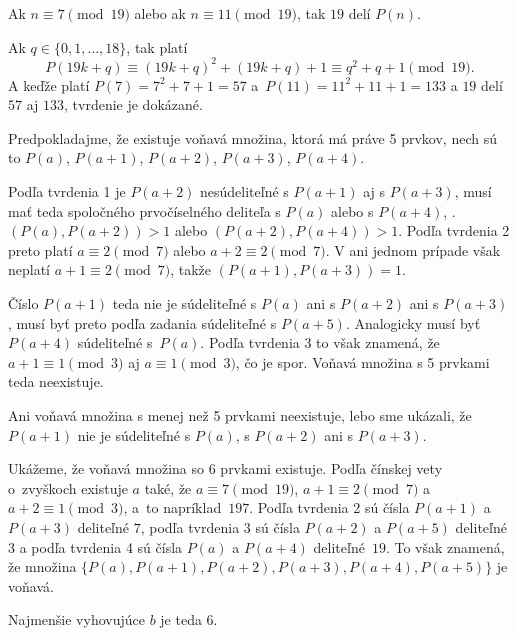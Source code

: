 {
Ak $n\equiv7\pmod{19}$ alebo ak $n\equiv11\pmod{19}$, tak $19$ delí $P(n)$.

\dokaz
Ak $q\in\{0,1,\dots,18\}$, tak platí $$P(19k+q)\equiv(19k+q)^2+(19k+q)+1\equiv q^2+q+1\pmod{19}.$$ A keďže platí
$P(7)=7^2+7+1=57$ a~$P(11)=11^2+11+1=133$ a $19$ delí $57$ aj $133$, tvrdenie je dokázané.

\smallskip
Predpokladajme, že existuje voňavá množina, ktorá má práve 5 prvkov,
nech sú to
$P(a)$,
$P(a+1)$,
$P(a+2)$,
$P(a+3)$,
$P(a+4)$.

Podľa tvrdenia 1 je $P(a+2)$ nesúdeliteľné s $P(a+1)$ aj s $P(a+3)$,
musí mať teda spoločného prvočíselného deliteľa s $P(a)$ alebo s $P(a+4)$,
\tj.
$(P(a),P(a+2))>1$
alebo
$(P(a+2),P(a+4))>1$.
Podľa tvrdenia 2 preto platí
$a\equiv2\pmod7$
alebo
$a+2\equiv2\pmod7$.
V ani jednom prípade však neplatí
$a+1\equiv2\pmod7$,
takže
$(P({a+1}),P({a+3}))=1$.

Číslo $P(a+1)$ teda nie je súdeliteľné s $P(a)$ ani s $P(a+2)$ ani s $P(a+3)$,
musí byť preto podľa zadania súdeliteľné s $P(a+5)$.
Analogicky musí byť $P(a+4)$ súdeliteľné s~$P(a)$.
Podľa tvrdenia 3 to však znamená, že
$a+1\equiv1\pmod3$
aj
$a\equiv1\pmod3$,
čo je spor.
Voňavá množina s 5 prvkami teda neexistuje.

Ani voňavá množina s menej než 5 prvkami neexistuje,
lebo sme ukázali, že $P({a+1})$ nie je súdeliteľné s $P(a)$, s $P(a+2)$ ani s $P(a+3)$.

Ukážeme, že voňavá množina so 6 prvkami existuje.
Podľa čínskej vety o~zvyškoch existuje $a$ také, že
$a\equiv7\pmod{19}$,
$a+1\equiv2\pmod7$
a
$a+2\equiv1\pmod3$,
a~to napríklad~$197$.
Podľa tvrdenia 2 sú čísla $P(a+1)$ a $P(a+3)$ deliteľné $7$,
podľa tvrdenia 3 sú čísla $P(a+2)$ a $P(a+5)$ deliteľné $3$
a podľa tvrdenia 4 sú čísla $P(a)$ a $P({a+4})$ deliteľné~$19$.
To však znamená, že množina
$\{P(a),P({a+1}),P({a+2}),P({a+3}),P({a+4}),P({a+5})\}$
je voňavá.

Najmenšie vyhovujúce $b$ je teda $6$.
}

